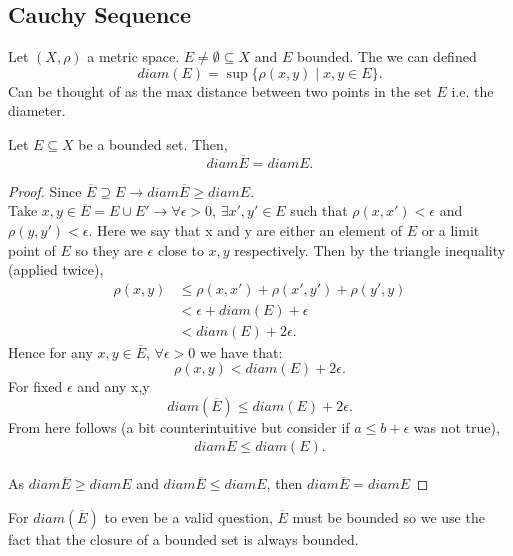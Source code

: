 \documentclass[a4paper]{article}
\begin{document}
\subsection{Cauchy Sequence}

\begin{definition}
 Let $(X, \rho)$ a metric space.  $E \neq \emptyset \subseteq X$ and  $E$ bounded. The we can defined
 \[
diam(E) = \sup \{\rho(x,y) \mid x,y \in E \} 
.\] 
Can be thought of as the max distance between two points in the set $E$ i.e. the diameter. 
\end{definition}
\begin{lemma}
Let $E \subseteq X$ be a bounded set. Then, 
\[
diam \overline{E} = diam E
.\] 

\begin{proof}
  Since $\overline{E} \supseteq E \to diam \overline{E} \geq diam E$. \\


  Take $x,y \in \overline{E} = E \cup E' \to \forall \epsilon > 0$, $\exists x',y' \in E$ such that $\rho(x,x') < \epsilon$ and $\rho(y,y') < \epsilon$. Here we say that x and y are either an element of $E$ or a limit point of  $E$ so they are  $\epsilon$ close to $x,y$ respectively. Then by the triangle inequality (applied twice), 
 \begin{align*}
   \rho(x,y) &\leq  \rho(x,x') + \rho(x',y') + \rho(y',y) \\
             &< \epsilon + diam(E) + \epsilon \\
             &< diam(E) + 2\epsilon
 .\end{align*}
 Hence for any $x,y \in \overline{E}$, $\forall \epsilon > 0$ we have that:
  \[
 \rho(x,y) < diam(E) + 2 \epsilon
 .\]
 For fixed $\epsilon$ and any x,y
 \[
 diam(\overline{E}) \leq diam(E) + 2 \epsilon
 .\] 
 From here follows (a bit counterintuitive but consider if $a \leq b + \epsilon$ was not true),
 \[
 diam \overline{E} \leq diam(E)
 .\] \\

 As $diam \overline{E} \geq diam E$ and $diam \overline{E} \leq diam E$, then $diam \overline{E} = diam E$
\end{proof}
\end{lemma}
\begin{note}
  For $diam(\overline{E})$ to even be a valid question, $\overline{E}$ must be bounded so we use the fact that the closure of a bounded set is always bounded.
\end{note}
\end{document}
